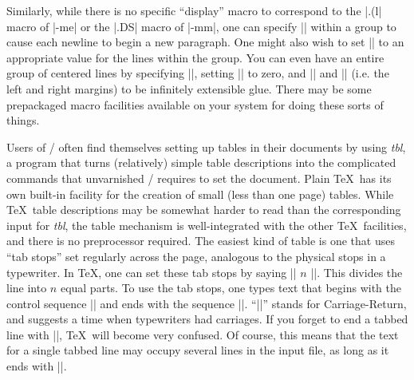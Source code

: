 Similarly, while there is no specific ``display'' macro
to correspond to the |.(l| macro of |-me| or
the |.DS| macro of |-mm|, one
can specify |\obeylines| within a group
to cause each newline to begin a new
paragraph.  One might also wish to set |\parindent|
to an appropriate value for the lines within the group.  You
can even have an entire group of centered lines by specifying |\obeylines|,
setting |\parindent| to zero, and |\leftskip| and |\rightskip|
(i.e. the left and right margins) to
be infinitely extensible glue.  There
may be some prepackaged
macro facilities available on your system for doing these sorts of
things.

Users of \Troff/ often find themselves setting up tables
in their documents by using {\it tbl\/}, a program that
turns (relatively) simple table descriptions into the
complicated commands that unvarnished \Troff/ requires
to set the document.  Plain \TeX\ has its own built-in
facility for the creation of small (less than one page)
tables.  While \TeX\ table descriptions may be
somewhat harder to read than the corresponding
input for {\it tbl},
the table mechanism is well-integrated with the other
\TeX\ facilities, and there is no preprocessor required.
The easiest kind of table is one that uses ``tab stops''
set regularly across the page, analogous to the physical stops
in a typewriter.  In \TeX, one can set these tab stops by
saying |\settabs| $n$ |\columns|.  This divides the line
into $n$ equal parts.  To use the tab stops, one types
text that begins with the control sequence |\+| 
and ends with the sequence |\cr|. 
``|\cr|'' stands for Carriage-Return,
and suggests a time when typewriters had carriages.  If you forget
to end a tabbed line with |\cr|, \TeX\ will become very confused.
Of course, this means that the text for a single tabbed line may
occupy several lines in the input file, as long as it ends
with |\cr|.

